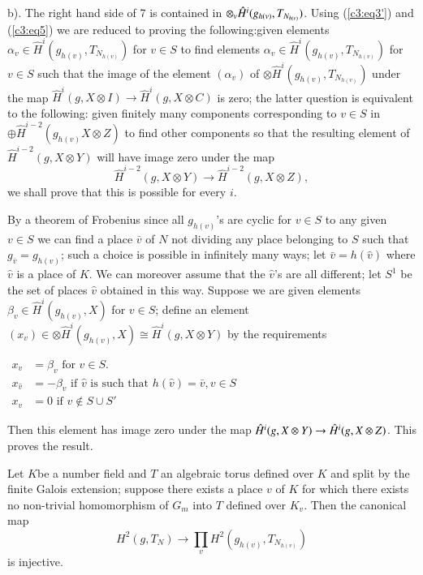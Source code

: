 \setcounter{proofoftheorem}{5}
\begin{proofoftheorem}%
b). The right hand side of 7 is contained in $\otimes_v\break \hat{H}^{i}
(g_{h(v)}, T_{N_{h(v)}})$. Using (\ref{c3:eq3'}) and (\ref{c3:eq5}) we are reduced to
proving the following:\pageoriginale given elements $\alpha_v \in \hat{H}^i
(g_{h(v)},T_{N_{h(v)}})$ for $v \in S$ to find elements $\alpha_v \in
\hat{H}^i (g_{h(v)}, T_{N_{h(v)}} )$ for $v \in S$ such that the image
of the element $(\alpha_v)$ of $\otimes \hat{H}^i
(g_{h(v)},T_{N_{h(v)}} )$ under the map $\hat{H}^i (g,X \otimes I)
\rightarrow \hat{H}^i (g,X \otimes C)$ is zero; the latter question is
equivalent to the following: given finitely many components
corresponding to $v \in S$ in $\oplus \hat{H}^{i-2} (g_{h(v)}X
\otimes Z)$ to find other components so that the resulting element of
$\hat{H}^{i-2} (g,X \otimes Y)$ will have image zero under the map 
$$
\hat{H}^{i-2} (g,X \otimes Y) \longrightarrow \hat{H}^{i-2} (g,X \otimes
Z), 
$$
we shall prove that this is possible for every $i$.
\end{proofoftheorem}

By a theorem of Frobenius since all $g_{h(v)}$'s are cyclic for $v \in
S$ to any given $v \in S$ we can find a place $\bar{v}$ of $N$ not
dividing any place belonging to $S$ such that $g_{\bar{v}} = g_{h(v)}$; such a
choice is possible in infinitely many ways; let $\bar{v} = h(\hat{v})$
where $\hat{v}$ is a place of $K$. We can moreover assume that the
$\hat{v}$'s are all different; let $S^1$ be the set of places
$\hat{v}$ obtained in this way.  Suppose we are given elements $ \beta_v\in
\hat{H}^i(g_{h(v)}, X)$ for $v \in S$; define an element $(x_v) \in
\otimes \hat{H}^i(g_{h(v)}, X)  \cong \hat{H}^i(g, X \otimes Y)$ by the
requirements 

$\begin{aligned}
x_v & = \beta_v \text{ for } v \in S.\\ 
x_{\hat{v}} & = -\beta_v  \text{ if } \hat{v} \text{ is such
  that } h(\hat{v}) = \bar{v}, v \in S\\ 
x_v  & = 0 \text{ if } v \not\in S \cup S'
\end{aligned}$

\noindent
Then this element has image zero under the map $\hat{H}^i(g, X \otimes
Y) \rightarrow \hat{H}^i(g,\break X \otimes Z)$. This proves the result. 

\begin{thm}\label{chap3:thm7}
Let $K$\pageoriginale be a number field and $T$ an algebraic torus
defined over $K$ 
and split by the finite Galois extension; suppose there exists a place
$v$ of $K$ for which there exists no non-trivial homomorphism of
$G_m$ into $T$ defined over $K_v$. Then the canonical map 
$$
H^2 (g, T_N) \longrightarrow \prod_v H^2 (g_{h(v)}, T_{N_{h(v)}}) 
$$
is injective.
\end{thm}

